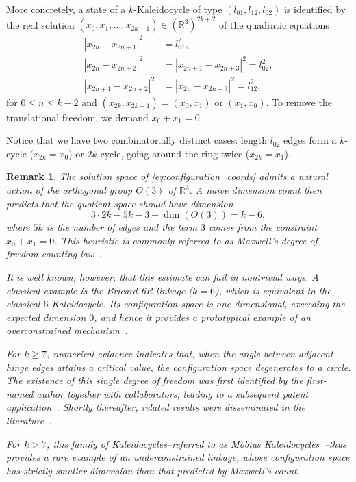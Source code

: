 \documentclass[10pt,leqno]{amsart}
\newtheorem{remark}[theorem]{Remark}
\numberwithin{equation}{section}
\begin{document}
More concretely, a state of a $k$-Kaleidocycle of type 
$(l_{01},l_{12},l_{02})$ is identified by the real solution
$(x_0,x_1,\ldots,x_{2k+1})\in (\mathbb{R}^3)^{2k+2}$
of the quadratic equations
\begin{align}\label{eq:configuration_coords}
|x_{2n} - x_{2n+1}|^2 &=l^2_{01}, \\
|x_{2n} - x_{2n+2}|^2 &=|x_{2n+1} - x_{2n+3}|^2=l^2_{02}, \nonumber \\
|x_{2n+1} - x_{2n+2}|^2&=|x_{2n} - x_{2n+3}|^2=l^2_{12}\nonumber,
\end{align}
for $0\le n\le k-2$
and $(x_{2k},x_{2k+1})=(x_0,x_1)$ or $(x_1,x_0)$. 
To remove the translational freedom, we demand $x_0+x_1=0$.

Notice that we have two combinatorially distinct cases: 
length $l_{02}$ edges form a $k$-cycle ($x_{2k}=x_0$) or $2k$-cycle, going around the ring twice ($x_{2k}=x_1$).

\begin{remark}\label{rem:dof}
    The solution space of \eqref{eq:configuration_coords} admits a natural action of the orthogonal group $O(3)$ of $\mathbb{R}^3$.
    A naive dimension count then predicts that the quotient space should have dimension
    \[
        3\cdot 2k - 5k - 3 - \dim(O(3)) = k - 6,
    \]
    where $5k$ is the number of edges and the term $3$ comes from the constraint $x_0 + x_1 = 0$.
    This heuristic is commonly referred to as Maxwell's degree-of-freedom counting law~\cite{FG:mobility}.

    It is well known, however, that this estimate can fail in nontrivial ways.
    A classical example is the Bricard 6R linkage ($k=6$), which is equivalent to the classical $6$-Kaleidocycle.
    Its configuration space is one-dimensional, exceeding the expected dimension $0$, and hence it provides a prototypical example of an \emph{overconstrained} mechanism~\cite{FG:mobility}.

    For $k \ge 7$, numerical evidence indicates that, when the angle between adjacent hinge edges attains a critical value,
    the configuration space degenerates to a circle.
    The existence of this single degree of freedom was first identified by the first-named author together with collaborators,
    leading to a subsequent patent application~\cite{KSFG:Kaleidocycle}.
    Shortly thereafter, related results were disseminated in the literature~\cite{JF:Kaleidocycle}.

For $k > 7$, this family of Kaleidocycles--referred to as M\"obius Kaleidocycles~\cite{KSFG:Kaleidocycle}--thus provides a rare example of an \emph{underconstrained} linkage,
    whose configuration space has strictly smaller dimension than that predicted by Maxwell's count.
\end{remark}
\end{document}
